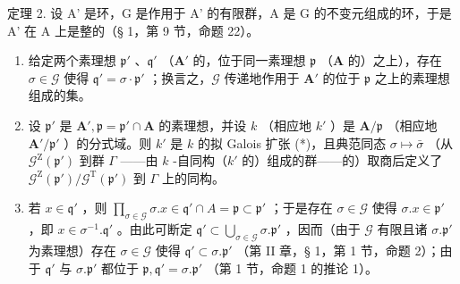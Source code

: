 定理 2. 设 A' 是环，G 是作用于 A' 的有限群，A 是 G 的不变元组成的环，于是 A' 在 A 上是整的（§ 1，第 9 节，命题 22）。

\begin{enumerate}
\def\labelenumi{(\roman{enumi})}
\item
  给定两个素理想 \(\mathfrak{p}'\) 、\(\mathfrak{q}'\) （\(\mathbf{A}'\) 的，位于同一素理想 \(\mathfrak{p}\) （\(\mathbf{A}\) 的）之上），存在 \(\sigma \in \mathcal{G}\) 使得 \(\mathfrak{q}' = \sigma \cdot \mathfrak{p}'\) ；换言之，\(\mathcal{G}\) 传递地作用于 \(\mathbf{A}'\) 的位于 \(\mathfrak{p}\) 之上的素理想组成的集。
\item
  设 \(\mathfrak{p}'\) 是 \(\mathbf{A}', \mathfrak{p} = \mathfrak{p}' \cap \mathbf{A}\) 的素理想，并设 \(k\) （相应地 \(k'\) ）是 \(\mathbf{A}/\mathfrak{p}\) （相应地 \(\mathbf{A}'/\mathfrak{p}'\) ）的分式域。则 \(k'\) 是 \(k\) 的拟 Galois 扩张 (*)，且典范同态 \(\sigma \mapsto \bar{\sigma}\) （从 \(\mathcal{G}^{\mathrm{Z}}(\mathfrak{p}')\) 到群 \(\Gamma\) ——由 \(k\) -自同构（\(k'\) 的）组成的群——的）取商后定义了 \(\mathcal{G}^{\mathrm{Z}}(\mathfrak{p}') / \mathcal{G}^{\mathrm{T}}(\mathfrak{p}')\) 到 \(\Gamma\) 上的同构。
\setcounter{enumi}{0}
\item
  若 \(x \in \mathfrak{q}'\) ，则 \(\prod_{\sigma \in \mathcal{G}} \sigma. x \in \mathfrak{q}' \cap A = \mathfrak{p} \subset \mathfrak{p}'\) ；于是存在 \(\sigma \in \mathcal{G}\) 使得 \(\sigma. x \in \mathfrak{p}'\) ，即 \(x \in \sigma^{-1}. \mathfrak{q}'\) 。由此可断定 \(\mathfrak{q}' \subset \bigcup_{\sigma \in \mathcal{G}} \sigma. \mathfrak{p}'\) ，因而（由于 \(\mathcal{G}\) 有限且诸 \(\sigma. \mathfrak{p}'\) 为素理想）存在 \(\sigma \in \mathcal{G}\) 使得 \(\mathfrak{q}' \subset \sigma. \mathfrak{p}'\) （第 II 章，§ 1，第 1 节，命题 2）；由于 \(\mathfrak{q}'\) 与 \(\sigma. \mathfrak{p}'\) 都位于 \(\mathfrak{p}, \mathfrak{q}' = \sigma. \mathfrak{p}'\) （第 1 节，命题 1 的推论 1）。
\end{enumerate}

